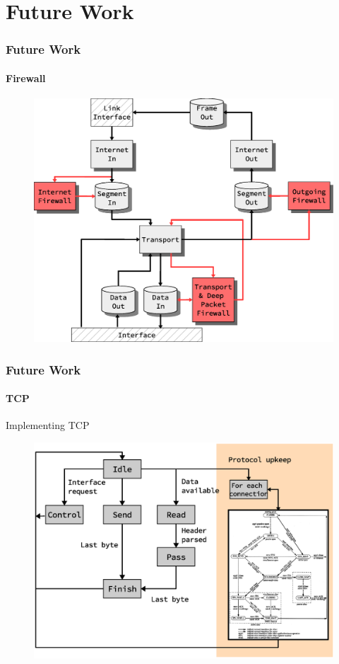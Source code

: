 \section{Future Work}
\begin{frame}
  \frametitle{Future Work}
\framesubtitle{Firewall}
\begin{figure}
\centering
\includegraphics[scale=0.30]{../thesis/future_work/firewall_integration_design.eps}
\end{figure}
\end{frame}


\begin{frame}
  \frametitle{Future Work}
\framesubtitle{TCP}
Implementing TCP
	\begin{figure}
\includegraphics[scale=0.30]{./future_work/transport_fsm.eps}
	\end{figure}
\end{frame}


